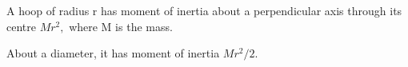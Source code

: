  A hoop of radius r has moment of inertia about a perpendicular
axis through its centre $Mr^{2},$  where M is the mass.
\par
About a diameter, it has moment of inertia $Mr^{2}/2.$ 
